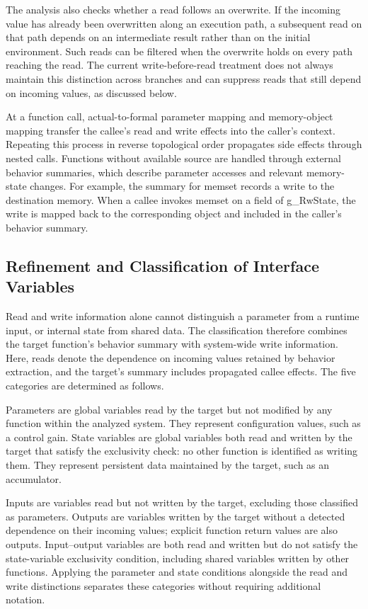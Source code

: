 \documentclass[manuscript, screen, review]{acmart}
\begin{document}
The analysis also checks whether a read follows an overwrite. If the incoming value has already been overwritten along an execution path, a subsequent read on that path depends on an intermediate result rather than on the initial environment. Such reads can be filtered when the overwrite holds on every path reaching the read. The current write-before-read treatment does not always maintain this distinction across branches and can suppress reads that still depend on incoming values, as discussed below.

At a function call, actual-to-formal parameter mapping and memory-object mapping transfer the callee's read and write effects into the caller's context. Repeating this process in reverse topological order propagates side effects through nested calls. Functions without available source are handled through external behavior summaries, which describe parameter accesses and relevant memory-state changes. For example, the summary for memset records a write to the destination memory. When a callee invokes memset on a field of g\_RwState, the write is mapped back to the corresponding object and included in the caller's behavior summary.


\subsection{Refinement and Classification of Interface Variables}

Read and write information alone cannot distinguish a parameter from a runtime input, or internal state from shared data. The classification therefore combines the target function's behavior summary with system-wide write information. Here, reads denote the dependence on incoming values retained by behavior extraction, and the target's summary includes propagated callee effects. The five categories are determined as follows.

Parameters are global variables read by the target but not modified by any function within the analyzed system. They represent configuration values, such as a control gain. State variables are global variables both read and written by the target that satisfy the exclusivity check: no other function is identified as writing them. They represent persistent data maintained by the target, such as an accumulator.

Inputs are variables read but not written by the target, excluding those classified as parameters. Outputs are variables written by the target without a detected dependence on their incoming values; explicit function return values are also outputs. Input–output variables are both read and written but do not satisfy the state-variable exclusivity condition, including shared variables written by other functions. Applying the parameter and state conditions alongside the read and write distinctions separates these categories without requiring additional notation.
\end{document}
